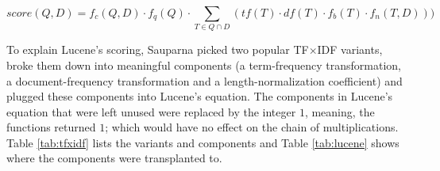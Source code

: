 \begin{equation}
  score(Q,D) = f_{c}(Q,D) \cdot f_{q}(Q) \cdot \displaystyle\sum_{T \in Q \cap D}(tf(T) \cdot df(T) \cdot f_{b}(T) \cdot f_{n}(T,D)))
  \label{eqn:Lucene-scoring-generalized}
\end{equation}

To explain Lucene's scoring, Sauparna picked two popular TF$\times$IDF
variants, broke them down into meaningful components (a term-frequency
transformation, a document-frequency transformation and a
length-normalization coefficient) and plugged these components into
Lucene's equation. The components in Lucene's equation that were left
unused were replaced by the integer $1$, meaning, the functions
returned $1$; which would have no effect on the chain of
multiplications. Table \ref{tab:tfxidf} lists the variants and
components and Table \ref{tab:lucene} shows where the components were
transplanted to.

